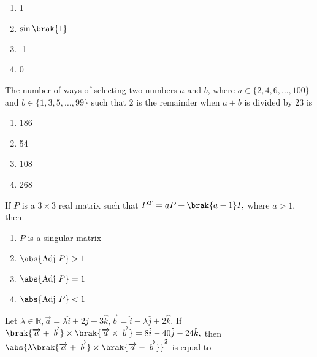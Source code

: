 \begin{multicols}{4}
\begin{enumerate}
    \item 1 
    \item $\sin\brak{1}$ 
    \item -1 
    \item 0
\end{enumerate}
\end{multicols}

\item The number of ways of selecting two numbers $a$ and $b$, where $a \in \{2, 4, 6, \ldots, 100\} $ and $b \in \{1, 3, 5, \ldots, 99\} $ such that $2$ is the remainder when $a + b$ is divided by $23$ is   \hfill {}

\begin{multicols}{4}
\begin{enumerate}
    \item 186 
    \item 54 
    \item 108 
    \item 268 
\end{enumerate}
\end{multicols}


\item If $P$ is a $3 \times 3$ real matrix such that $P^T = aP + \brak{a - 1}I,$ where $a > 1$, then    \hfill {}

\begin{multicols}{2}
\begin{enumerate}
    \item $P$ is a singular matrix
    \item $\abs{\text{Adj } P} > 1$
    \item $\abs{\text{Adj } P} = 1$
    \item $\abs{\text{Adj } P} < 1$
\end{enumerate}
\end{multicols}

\item Let $\lambda \in \mathbb{R}, \overrightarrow{a} = \lambda \hat{i} + 2 \hat{j} - 3 \hat{k}, \overrightarrow{b} = \hat{i} - \lambda \hat{j} + 2 \hat{k}.$ If $\brak{\overrightarrow{a} + \overrightarrow{b}} \times \brak{\overrightarrow{a} \times \overrightarrow{b}} = 8 \hat{i} - 40 \hat{j} - 24 \hat{k},
$ then $\abs{\lambda \brak{\overrightarrow{a} + \overrightarrow{b}} \times \brak{\overrightarrow{a} - \overrightarrow{b}}}^2$ is equal to    \hfill {}

